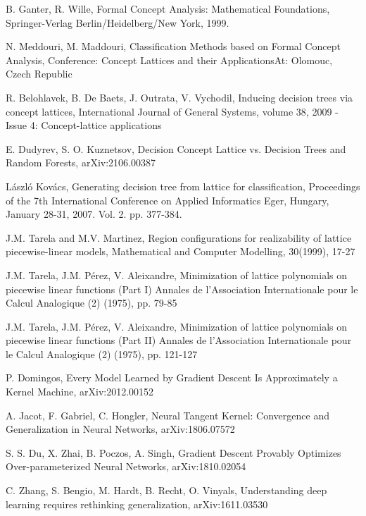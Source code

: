 \documentclass{beamer}
\begin{document}
\begin{thebibliography}{...}
     B. Ganter, R. Wille, Formal Concept Analysis: Mathematical Foundations, 
    Springer-Verlag Berlin/Heidelberg/New York, 1999.

     N. Meddouri, M. Maddouri, Classification Methods based on Formal Concept Analysis,
    Conference: Concept Lattices and their ApplicationsAt: Olomouc, Czech Republic

     R. Belohlavek, B. De Baets, J. Outrata, V. Vychodil, Inducing decision trees via concept lattices,
    International Journal of General Systems, volume 38, 2009 - Issue 4: Concept-lattice applications

     E. Dudyrev, S. O. Kuznetsov, Decision Concept Lattice vs. Decision Trees and Random Forests,
    arXiv:2106.00387

     László Kovács, Generating decision tree from lattice for classification,
    Proceedings of the 7th International Conference on Applied Informatics
    Eger, Hungary, January 28-31, 2007. Vol. 2. pp. 377-384.

     J.M. Tarela and M.V. Martinez, Region configurations for realizability of lattice
    piecewise-linear models, Mathematical and Computer Modelling, 30(1999), 17-27

     J.M. Tarela, J.M. Pérez, V. Aleixandre, Minimization of lattice polynomials on piecewise linear functions
    (Part I)
    Annales de l'Association Internationale pour le Calcul Analogique (2) (1975), pp. 79-85

     J.M. Tarela, J.M. Pérez, V. Aleixandre, Minimization of lattice polynomials on piecewise linear functions
    (Part II)
    Annales de l'Association Internationale pour le Calcul Analogique (2) (1975), pp. 121-127

     P. Domingos, Every Model Learned by Gradient Descent Is Approximately a Kernel Machine,
    arXiv:2012.00152

     A. Jacot, F. Gabriel, C. Hongler, Neural Tangent Kernel: Convergence and Generalization in Neural Networks,
    arXiv:1806.07572

     S. S. Du, X. Zhai, B. Poczos, A. Singh, Gradient Descent Provably Optimizes Over-parameterized Neural Networks,
    arXiv:1810.02054

     C. Zhang, S. Bengio, M. Hardt, B. Recht, O. Vinyals, Understanding deep learning requires rethinking generalization,
    arXiv:1611.03530


\end{thebibliography}
\end{document}
